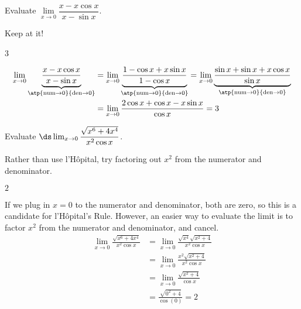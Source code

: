 \begin{question}[1997D]
Evaluate $\lim\limits_{x\rightarrow 0}\dfrac{x-x\cos x}{x-\sin x}$.
\end{question}
\begin{hint} Keep at it!
\end{hint}
\begin{answer} 3
\end{answer}
\begin{solution}
\begin{align*}
\lim_{x\rightarrow 0}\underbrace{\frac{x-x\cos x}{x-\sin x}}_{\atp
	{\mathrm{num}\to0}
	{\mathrm{den}\to0}}
&= \lim_{x\rightarrow 0}\underbrace{\frac{1-\cos x+x\sin x}{1-\cos x}}_{\atp
	{\mathrm{num}\to0}
	{\mathrm{den}\to0}}
= \lim_{x\rightarrow 0}\underbrace{\frac{\sin x+\sin x+x\cos x}{\sin x}}_{\atp
	{\mathrm{num}\to0}
	{\mathrm{den}\to0}}\\
&= \lim_{x\rightarrow 0}\frac{2\cos x+\cos x-x\sin x}{\cos x}
={3}
\end{align*}
\end{solution}




\begin{question}
Evaluate
$\ds\lim_{x \to 0}\dfrac{\sqrt{x^6+4x^4}}{x^2\cos x}$.
\end{question}
\begin{hint} Rather than use l'H\^opital, try factoring out $x^2$ from the numerator and denominator.
\end{hint}
\begin{answer}
$2$
\end{answer}
\begin{solution}
If we plug in $x=0$ to the numerator and denominator, both are zero, so this is a candidate for l'H\^opital's Rule. However, an easier way to evaluate the limit is to factor $x^2$ from the numerator and denominator, and cancel.
\begin{align*}
\lim_{x\to0}\frac{\sqrt{x^6+4x^4}}{x^2\cos x}
&=\lim_{x\to0}\frac{\sqrt{x^4}\sqrt{x^2+4}}{x^2\cos x}\\
&=\lim_{x\to0}\frac{x^2\sqrt{x^2+4}}{x^2\cos x}\\
&=\lim_{x\to0}\frac{\sqrt{x^2+4}}{\cos x}\\
&=\frac{\sqrt{0^2+4}}{\cos(0)}=2
\end{align*}
\end{solution}

